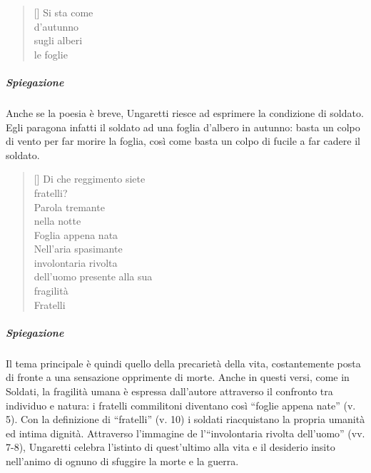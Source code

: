 \documentclass[12pt]{report}
\begin{document}
		
		\renewcommand{\poemtoc}{subsection}
		\settowidth{\versewidth}{There was an old party of Lyme}
		
		\begin{verse}[\versewidth]
			Si sta come\\
			d'autunno\\
			sugli alberi\\
			le foglie\\
		\end{verse}
		
		\subparagraph[Soldati]{Spiegazione}Anche se la poesia è breve, Ungaretti riesce ad esprimere la condizione di soldato. Egli paragona infatti il soldato ad una foglia d'albero in autunno: basta un colpo di vento per far morire la foglia, così come basta un colpo di fucile a far cadere il soldato.
		
		\onecolumn
			\renewcommand{\poemtoc}{subsection}
		\settowidth{\versewidth}{There was an old party of Lyme}
		
		\begin{verse}[\versewidth]
			Di che reggimento siete\\
			fratelli?\\
			
			Parola tremante\\
			nella notte\\
			
			Foglia appena nata\\
			
			Nell'aria spasimante\\
			involontaria rivolta\\
			dell'uomo presente alla sua\\
			fragilità\\
			
			Fratelli\\
		\end{verse}
			
		\subparagraph[Fratelli]{Spiegazione}Il tema principale è quindi quello della precarietà della vita, costantemente posta di fronte a una sensazione opprimente di morte. Anche in questi versi, come in Soldati, la fragilità umana è espressa dall'autore attraverso il confronto tra individuo e natura: i fratelli commilitoni diventano così “foglie appena nate” (v. 5). Con la definizione di “fratelli” (v. 10) i soldati riacquistano la propria umanità ed intima dignità. Attraverso l'immagine de l'“involontaria rivolta dell'uomo” (vv. 7-8), Ungaretti celebra l'istinto di quest'ultimo alla vita e il desiderio insito nell'animo di ognuno di sfuggire la morte e la guerra.
		
\end{document}
